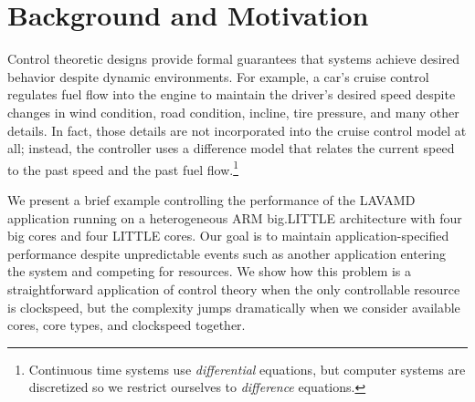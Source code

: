 \section{Background and Motivation}
\label{sec:example}

Control theoretic designs provide formal guarantees that systems
achieve desired behavior despite dynamic environments. For example, a
car's cruise control regulates fuel flow into the engine to maintain
the driver's desired speed despite changes in wind condition, road
condition, incline, tire pressure, and many other details.  In fact,
those details are not incorporated into the cruise control model at
all; instead, the controller uses a difference model that relates the
current speed to the past speed and the past fuel
flow.\footnote{Continuous time systems use \emph{differential}
  equations, but computer systems are discretized so we restrict
  ourselves to \emph{difference} equations.}

We present a brief example controlling the performance of the LAVAMD
application running on a heterogeneous ARM big.LITTLE architecture
with four big cores and four LITTLE cores.  Our goal is to maintain
application-specified performance despite unpredictable events such as
another application entering the system and competing for resources.
We show how this problem is a straightforward application of control
theory when the only controllable resource is clockspeed, but the
complexity jumps dramatically when we consider available cores, core
types, and clockspeed together.


